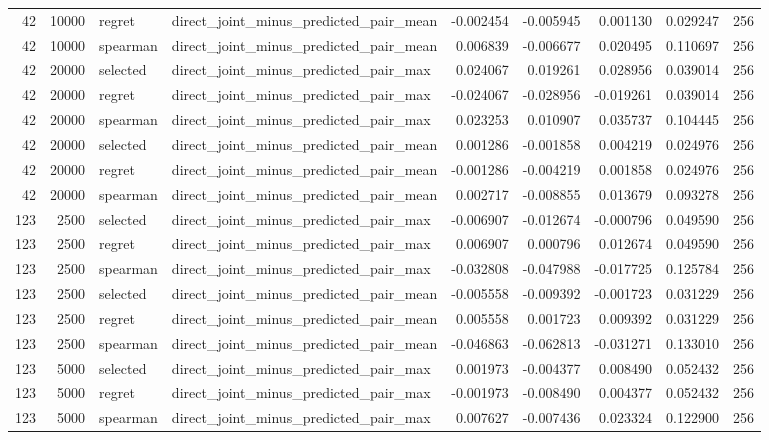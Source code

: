 \begin{tabular}{rrllrrrrr}
42 & 10000 & regret & direct_joint_minus_predicted_pair_mean & -0.002454 & -0.005945 & 0.001130 & 0.029247 & 256 \\
42 & 10000 & spearman & direct_joint_minus_predicted_pair_mean & 0.006839 & -0.006677 & 0.020495 & 0.110697 & 256 \\
42 & 20000 & selected & direct_joint_minus_predicted_pair_max & 0.024067 & 0.019261 & 0.028956 & 0.039014 & 256 \\
42 & 20000 & regret & direct_joint_minus_predicted_pair_max & -0.024067 & -0.028956 & -0.019261 & 0.039014 & 256 \\
42 & 20000 & spearman & direct_joint_minus_predicted_pair_max & 0.023253 & 0.010907 & 0.035737 & 0.104445 & 256 \\
42 & 20000 & selected & direct_joint_minus_predicted_pair_mean & 0.001286 & -0.001858 & 0.004219 & 0.024976 & 256 \\
42 & 20000 & regret & direct_joint_minus_predicted_pair_mean & -0.001286 & -0.004219 & 0.001858 & 0.024976 & 256 \\
42 & 20000 & spearman & direct_joint_minus_predicted_pair_mean & 0.002717 & -0.008855 & 0.013679 & 0.093278 & 256 \\
123 & 2500 & selected & direct_joint_minus_predicted_pair_max & -0.006907 & -0.012674 & -0.000796 & 0.049590 & 256 \\
123 & 2500 & regret & direct_joint_minus_predicted_pair_max & 0.006907 & 0.000796 & 0.012674 & 0.049590 & 256 \\
123 & 2500 & spearman & direct_joint_minus_predicted_pair_max & -0.032808 & -0.047988 & -0.017725 & 0.125784 & 256 \\
123 & 2500 & selected & direct_joint_minus_predicted_pair_mean & -0.005558 & -0.009392 & -0.001723 & 0.031229 & 256 \\
123 & 2500 & regret & direct_joint_minus_predicted_pair_mean & 0.005558 & 0.001723 & 0.009392 & 0.031229 & 256 \\
123 & 2500 & spearman & direct_joint_minus_predicted_pair_mean & -0.046863 & -0.062813 & -0.031271 & 0.133010 & 256 \\
123 & 5000 & selected & direct_joint_minus_predicted_pair_max & 0.001973 & -0.004377 & 0.008490 & 0.052432 & 256 \\
123 & 5000 & regret & direct_joint_minus_predicted_pair_max & -0.001973 & -0.008490 & 0.004377 & 0.052432 & 256 \\
123 & 5000 & spearman & direct_joint_minus_predicted_pair_max & 0.007627 & -0.007436 & 0.023324 & 0.122900 & 256 \\

\end{tabular}

